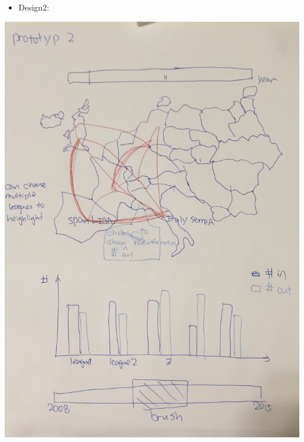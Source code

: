 \documentclass[11pt]{article}
\begin{document}
\begin{itemize}
\item Design2:
\end{itemize}
\includegraphics[width=.9\linewidth]{Design5.png}
\end{document}
